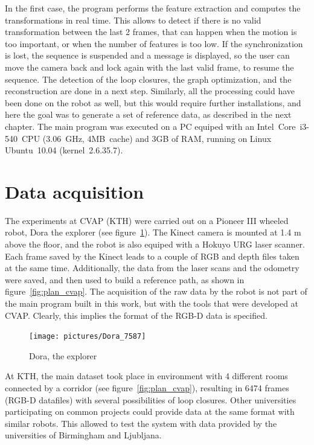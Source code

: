 In the first case, the program performs the feature extraction and computes the transformations in real time. This allows to detect if there is no valid transformation between the last 2 frames, that can happen when the motion is too important, or when the number of features is too low. If the synchronization is lost, the sequence is suspended and a message is displayed, so the user can move the camera back and lock again with the last valid frame, to resume the sequence. The detection of the loop closures, the graph optimization, and the reconstruction are done in a next step. Similarly, all the processing could have been done on the robot as well, but this would require further installations, and here the goal was to generate a set of reference data, as described in the next chapter. The main program was executed on a PC equiped with an Intel~Core\texttrademark{}~i3-540~CPU (3.06~GHz, 4MB~cache) and 3GB of RAM, running on Linux Ubuntu~10.04 (kernel~2.6.35.7).

\clearpage
\section{Data acquisition}

The experiments at \gls{CVAP} (KTH) were carried out on a Pioneer III wheeled robot, Dora the explorer (see figure~\ref{fig:dora}). The Kinect camera is mounted at 1.4 m above the floor, and the robot is also equiped with a Hokuyo URG laser scanner. Each frame saved by the Kinect leads to a couple of RGB and depth files taken at the same time. Additionally, the data from the laser scans and the odometry were saved, and then used to build a reference path, as shown in figure~\ref{fig:plan_cvap}. The acquisition of the raw data by the robot is not part of the main program built in this work, but with the tools that were developed at \gls{CVAP}. Clearly, this implies the format of the RGB-D data is specified.

\begin{figure}[h]
 \begin{center}
 \texttt{[image: pictures/Dora\_7587]}
 \end{center}
\caption{Dora, the explorer}
\label{fig:dora}
\end{figure}

At KTH, the main dataset took place in environment with 4 different rooms connected by a corridor (see figure~\ref{fig:plan_cvap}), resulting in 6474 frames (RGB-D datafiles) with several possibilities of loop closures. Other universities participating on common projects could provide data at the same format with similar robots. This allowed to test the system with data provided by the universities of Birmingham and Ljubljana.

